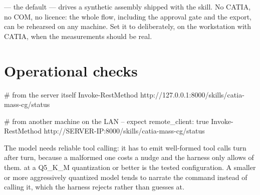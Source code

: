  --- the default --- drives a synthetic assembly
shipped with the skill. No CATIA, no COM, no licence: the whole flow, including
the approval gate and the export, can be rehearsed on any machine. Set it to
 deliberately, on the workstation with CATIA, when the measurements
should be real.

\section{Operational checks}

\begin{shellblock}
# from the server itself
Invoke-RestMethod http://127.0.0.1:8000/skills/catia-mass-cg/status

# from another machine on the LAN -- expect remote_client: true
Invoke-RestMethod http://SERVER-IP:8000/skills/catia-mass-cg/status
\end{shellblock}

The model needs reliable tool calling: it has to emit well-formed tool calls turn
after turn, because a malformed one costs a nudge and the harness only allows
 of them.  at a
Q5\_K\_M quantization or better is the tested configuration. A smaller or more
aggressively quantized model tends to narrate the command instead of calling it,
which the harness rejects rather than guesses at.
